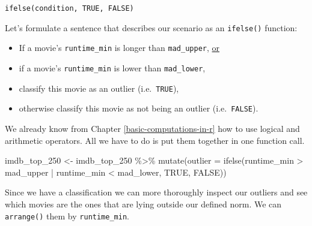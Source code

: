 \documentclass[
]{book}
\newenvironment{Shaded}{\begin{snugshade}}{\end{snugshade}}
\newcommand{\AttributeTok}[1]{\textcolor[rgb]{0.77,0.63,0.00}{#1}}
\newcommand{\ConstantTok}[1]{\textcolor[rgb]{0.00,0.00,0.00}{#1}}
\newcommand{\FunctionTok}[1]{\textcolor[rgb]{0.00,0.00,0.00}{#1}}
\newcommand{\NormalTok}[1]{#1}
\newcommand{\OtherTok}[1]{\textcolor[rgb]{0.56,0.35,0.01}{#1}}
\newcommand{\SpecialCharTok}[1]{\textcolor[rgb]{0.00,0.00,0.00}{#1}}
\begin{document}
\leavevmode\hypertarget{ifelse-function}{}%
\texttt{ifelse(condition,\ TRUE,\ FALSE)}

Let's formulate a sentence that describes our scenario as an \texttt{ifelse()} function:

\begin{itemize}
\item
  If a movie's \texttt{runtime\_min} is longer than \texttt{mad\_upper}, \underline{or}
\item
  if a movie's \texttt{runtime\_min} is lower than \texttt{mad\_lower},
\item
  classify this movie as an outlier (i.e.~\texttt{TRUE}),
\item
  otherwise classify this movie as not being an outlier (i.e.~\texttt{FALSE}).
\end{itemize}

We already know from Chapter \ref{basic-computations-in-r} how to use logical and arithmetic operators. All we have to do is put them together in one function call.

\begin{Shaded}
\begin{Highlighting}[]
\NormalTok{imdb\_top\_250 }\OtherTok{\textless{}{-}}\NormalTok{ imdb\_top\_250 }\SpecialCharTok{\%\textgreater{}\%} 
  \FunctionTok{mutate}\NormalTok{(}\AttributeTok{outlier =} \FunctionTok{ifelse}\NormalTok{(runtime\_min }\SpecialCharTok{\textgreater{}}\NormalTok{ mad\_upper }\SpecialCharTok{|}\NormalTok{ runtime\_min }\SpecialCharTok{\textless{}}\NormalTok{ mad\_lower,}
                          \ConstantTok{TRUE}\NormalTok{, }\ConstantTok{FALSE}\NormalTok{))}
\end{Highlighting}
\end{Shaded}

Since we have a classification we can more thoroughly inspect our outliers and see which movies are the ones that are lying outside our defined norm. We can \texttt{arrange()} them by \texttt{runtime\_min}.
\end{document}
